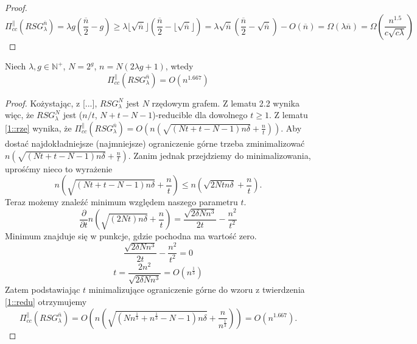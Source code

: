 \begin{proof}
	$$ \Pi_{cc}^{ \parallel }(RSG_{\lambda}^{\overline{n}}) = \lambda g \left( \frac{ \overline{n}}{2} - g \right) \geq \lambda \lfloor \sqrt{ \overline{n}} \rfloor \left( \frac{ \overline{n}}{2} - \lfloor \sqrt{ \overline{n}} \rfloor \right) = \lambda \sqrt{ \overline{n}} \left( \frac{ \overline{n}}{2} - \sqrt{ \overline{n}} \right) - O(\overline{n}) =  \Omega \left( \lambda \overline{n} \right) = \Omega \left( \frac{n^{1.5}}{c \sqrt{c \lambda}} \right) $$
	
\end{proof}



\begin{theorem}
	Niech $\lambda, g \in \mathbb{N}^{+}$, $N = 2^{g}$, $n = N(2 \lambda g + 1)$, wtedy
	$$ \Pi_{cc}^{ \parallel }(RSG_{\lambda}^{\overline{n}}) = O \left( n^{1.667} \right) $$
\end{theorem}

\begin{proof}
	Kożystając, z [...], $RSG_{\lambda}^{N}$ jest $N$ rzędowym grafem.
	Z lematu 2.2 wynika więc, że $RSG_{\lambda}^{N}$  jest ($n / t$, $N + t - N - 1$)-reducible dla dowolnego $t \geq 1$.
	Z lematu \ref{1::rze} wynika, że $\Pi_{cc}^{ \parallel }(RSG_{\lambda}^{\overline{n}}) = O \left( n \left( \sqrt{( N t + t - N - 1)n \delta } + \frac{n}{t} \right) \right)$.
	Aby dostać najdokładniejsze (najmniejsze) ograniczenie górne trzeba zminimalizować
	$n \left( \sqrt{( N t + t - N - 1)n \delta } + \frac{n}{t} \right)$.
	Zanim jednak przejdziemy do minimalizowania, uprośćmy nieco to wyrażenie
	$$ n \left( \sqrt{( N t + t - N - 1)n \delta } + \frac{n}{t} \right) \leq n \left( \sqrt{ 2N t n \delta } + \frac{n}{t} \right) .$$
	Teraz możemy znaleźć minimum względem naszego parametru $t$.
	$$ \frac{\partial}{\partial t} n \left( \sqrt{( 2N t)n \delta } + \frac{n}{t} \right) = \frac{ \sqrt{ 2 \delta N n^{3} }}{2t} - \frac{n^{2}}{t^{2}}$$
	Minimum znajduje się w punkcje, gdzie pochodna ma wartość zero.
	$$ \frac{ \sqrt{ 2 \delta N n^{3} }}{2t} - \frac{n^{2}}{t^{2}} = 0$$
	$$ t = \frac{2n^{2}}{ \sqrt{ 2 \delta N n^{3} }} = O \left( n^{\frac{1}{3}} \right) $$
	Zatem podstawiając $t$ minimalizujące ograniczenie górne do wzoru z twierdzenia \ref{1::redu} otrzymujemy
	$$ \Pi_{cc}^{ \parallel }(RSG_{\lambda}^{\overline{n}}) = O \left( n \left( \sqrt{( N n^{\frac{1}{3}} + n^{\frac{1}{3}} - N - 1)n \delta } + \frac{n}{n^{\frac{1}{3}}} \right) \right) = O \left( n^{1.667} \right). $$
\end{proof}










